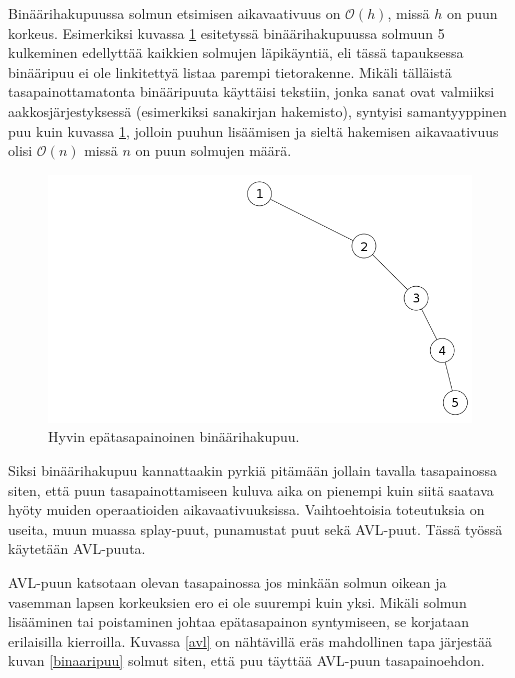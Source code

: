 \documentclass[12pt,a4paper,titlepage]{article}
\begin{document}
Binäärihakupuussa solmun etsimisen aikavaativuus on $\mathcal{O}(h)$, missä $h$ on puun korkeus. Esimerkiksi kuvassa \ref{epatasapaino} esitetyssä binäärihakupuussa solmuun 5 kulkeminen edellyttää kaikkien solmujen läpikäyntiä, eli tässä tapauksessa binääripuu ei ole linkitettyä listaa parempi tietorakenne. Mikäli tälläistä tasapainottamatonta binääripuuta käyttäisi tekstiin, jonka sanat ovat valmiiksi aakkosjärjestyksessä (esimerkiksi sanakirjan hakemisto), syntyisi samantyyppinen puu kuin kuvassa \ref{epatasapaino}, jolloin puuhun lisäämisen ja sieltä hakemisen aikavaativuus olisi $\mathcal{O}(n)$ missä $n$ on puun solmujen määrä.~\cite{cormen}

\begin{figure}
\centering
\includegraphics[width=15cm]{kuvat/binaaripuu-epatasapaino.png}
\caption{Hyvin epätasapainoinen binäärihakupuu.}
\label{epatasapaino}
\end{figure}

Siksi binäärihakupuu kannattaakin pyrkiä pitämään jollain tavalla tasapainossa siten, että puun tasapainottamiseen kuluva aika on pienempi kuin siitä saatava hyöty muiden operaatioiden aikavaativuuksissa. Vaihtoehtoisia toteutuksia on useita, muun muassa splay-puut, punamustat puut sekä AVL-puut. Tässä työssä käytetään AVL-puuta.~\cite{cormen}

AVL-puun katsotaan olevan tasapainossa jos minkään solmun oikean ja vasemman lapsen korkeuksien ero ei ole suurempi kuin yksi. Mikäli solmun lisääminen tai poistaminen johtaa epätasapainon syntymiseen, se korjataan erilaisilla kierroilla. Kuvassa \ref{avl} on nähtävillä eräs mahdollinen tapa järjestää kuvan \ref{binaaripuu} solmut siten, että puu täyttää AVL-puun tasapainoehdon.~\cite{cormen}
\end{document}

